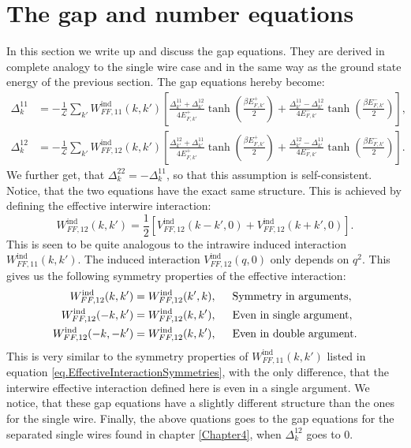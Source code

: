 \section{The gap and number equations}
\label{sec.2wiresgapandnumberequations}
In this section we write up and discuss the gap equations. They are derived in complete analogy to the single wire case and in the same way as the ground state energy of the previous section. The gap equations hereby become:
\begin{align}
\Delta^{11}_k &= -\frac{1}{\mathcal{L}}\sum_{k'} W^\text{ind}_{FF,11}(k, k')\left[\frac{\Delta^{11}_{k'} + \Delta^{12}_{k'}}{4E^{+}_{F,k'}}\tanh\left(\frac{\beta E^{+}_{F,k'}}{2}\right) + \frac{\Delta^{11}_{k'} - \Delta^{12}_{k'}}{4E^{-}_{F,k'}}\tanh\left(\frac{\beta E^{-}_{F,k'}}{2}\right)\right], \nonumber \\
\Delta^{12}_k &= -\frac{1}{\mathcal{L}}\sum_{k'} W^\text{ind}_{FF,12}(k, k')\left[\frac{\Delta^{12}_{k'} + \Delta^{11}_{k'}}{4E^{+}_{F,k'}}\tanh\left(\frac{\beta E^{+}_{F,k'}}{2}\right) + \frac{\Delta^{12}_{k'} - \Delta^{11}_{k'}}{4E^{-}_{F,k'}}\tanh\left(\frac{\beta E^{-}_{F,k'}}{2}\right)\right].
\label{eq.2wiresgapequations}
\end{align}
We further get, that $\Delta^{22}_k = - \Delta^{11}_k$, so that this assumption is self-consistent. Notice, that the two equations have the exact same structure. This is achieved by defining the effective interwire interaction: 
\begin{equation}
W^\text{ind}_{FF,12}(k, k') = \frac{1}{2}\left[V^\text{ind}_{FF,12}(k - k', 0) + V^\text{ind}_{FF,12}(k + k', 0) \right].
\end{equation}
This is seen to be quite analogous to the intrawire induced interaction $W^\text{ind}_{FF,11}(k, k')$. The induced interaction $V^\text{ind}_{FF,12}(q, 0)$ only depends on $q^2$. This gives us the following symmetry properties of the effective interaction:
\begin{align}
W^\text{ind}_{FF,12}(k,k')   &= W^\text{ind}_{FF,12}(k',k), \hspace{0.5cm} \text{Symmetry in arguments}, \nonumber \\
W^\text{ind}_{FF,12}(-k,k')  &= W^\text{ind}_{FF,12}(k,k'), \hspace{0.5cm} \text{Even in single argument}, \nonumber \\
W^\text{ind}_{FF,12}(-k,-k') &= W^\text{ind}_{FF,12}(k,k'), \hspace{0.5cm} \text{Even in double argument}.
\label{eq.EffectiveInterwireInteractionSymmetries}
\end{align}
This is very similar to the symmetry properties of $W^\text{ind}_{FF,11}(k, k')$ listed in equation \ref{eq.EffectiveInteractionSymmetries}, with the only difference, that the interwire effective interaction defined here is even in a single argument. We notice, that these gap equations have a slightly different structure than the ones for the single wire. Finally, the above quations goes to the gap equations for the separated single wires found in chapter \ref{Chapter4}, when $\Delta^{12}_k$ goes to $0$.  	

